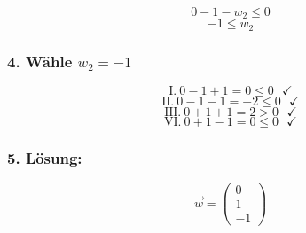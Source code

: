 \documentclass[a4paper,11pt,twoside]{scrartcl}
\begin{document}
\[ 0 -1 -w_2 \leq 0\]
\[ -1 \leq w_2\]
\subsubsection*{4. Wähle $w_2 = -1$}

\[\text{I.}~0 - 1 +1 = 0 \leq 0~~~\checkmark \]
\[\text{II.}~0 - 1 - 1 = -2 \leq 0~~~\checkmark \]
\[\text{III.}~0 + 1 +1 = 2 > 0~~~\checkmark \]
\[\text{VI.}~0 + 1 -1 = 0 \leq 0~~~\checkmark \]

\subsubsection*{5. Lösung:}
\[
\overset{\rightarrow}{w} = \begin{pmatrix}
           0 \\
           1 \\
           -1
         \end{pmatrix}
\] 
       
\end{document}
